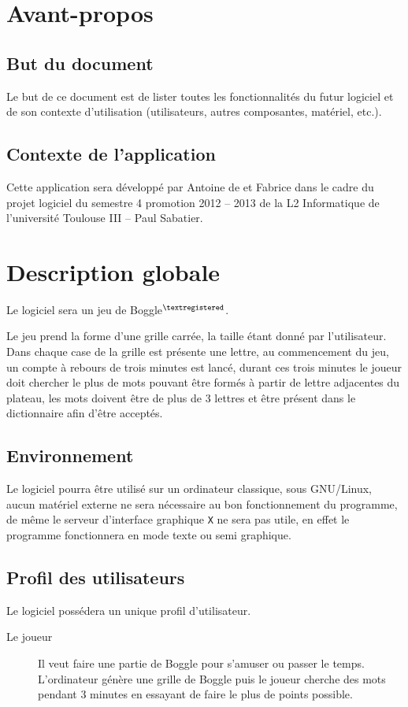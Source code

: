 \documentclass[12pt,a4paper,openany]{article}
\begin{document}
	\setcounter{tocdepth}{2}
	\setcounter{secnumdepth}{3}
	\maketitle
	\tableofcontents
	\newpage
	\section{Avant-propos}
		\subsection{But du document}
	Le but de ce document est de lister toutes les fonctionnalités du futur logiciel et de son contexte d’utilisation (utilisateurs, autres composantes,
	matériel,  etc.).
		\subsection{Contexte de l'application}
		Cette application sera développé par Antoine de  et Fabrice  dans le cadre du projet logiciel du 
		semestre 4 promotion 2012 -- 2013 de la L2 Informatique de l'université Toulouse III -- Paul Sabatier.
	
	\section{Description globale} 
	Le logiciel sera un jeu de Boggle$^{\tiny\textregistered}$.

	Le jeu prend la forme d'une grille carrée, la taille étant donné par l'utilisateur. Dans chaque case de la grille est présente une lettre, au
	commencement du jeu, un compte à rebours de trois minutes est lancé, durant ces trois minutes le joueur doit chercher le plus de mots pouvant être
	formés à partir de lettre adjacentes du plateau, les mots doivent être de plus de 3 lettres et être présent dans le dictionnaire afin d'être
	acceptés.
	\subsection{Environnement}
		Le logiciel pourra être utilisé sur un ordinateur classique, sous GNU/Linux, aucun matériel externe ne sera nécessaire au bon fonctionnement du
		programme, de même le serveur d'interface graphique \texttt{X} ne sera pas utile, en effet le programme fonctionnera en mode texte ou semi graphique.
	\subsection{Profil des utilisateurs}
		Le logiciel possédera un unique profil d'utilisateur.
		\begin{description}
			\item[Le joueur] Il veut faire une partie de Boggle pour s'amuser ou passer le temps. L'ordinateur génère une grille de Boggle puis le
				joueur cherche des mots pendant 3 minutes en essayant de faire le plus de points possible. 
		\end{description}
\end{document}
